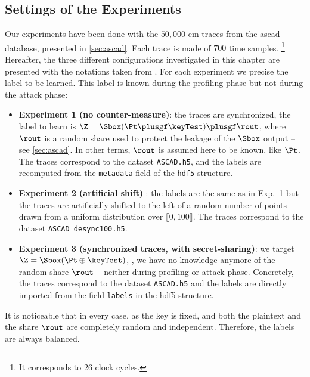 \subsection{Settings of the Experiments}
\label{sec:settings_cosade}
Our experiments have been done with the \(50,000\) \gls{em} traces from the \gls{ascad} database, presented in \autoref{sec:ascad}.
Each trace is made of \(700\) time samples.%
\footnote{
	It corresponds to 26 clock cycles.
}
Hereafter, the three different configurations investigated in this chapter are presented with the notations taken from \cite{prouff_study_2018}. 
For each experiment we precise the label to be learned.
This label is known during the profiling phase but not during the attack phase:
\begin{itemize}
	\item \textbf{Experiment 1 (no counter-measure)}: the traces are synchronized, the label to learn is \(\Z = \Sbox(\Pt \plusgf \keyTest) \plusgf \rout\), where \(\rout\) is a random share used to protect the leakage of the \(\Sbox\) output -- see \autoref{sec:ascad}.
	In other terms, \(\rout\) is assumed here to be known, like \(\Pt\).
	The traces correspond to the dataset \verb+ASCAD.h5+, and the labels are recomputed from the \verb+metadata+ field of the \verb+hdf5+ structure.
    \item \textbf{Experiment 2 (artificial shift)} : the labels are the same as in Exp.~1 but the traces are  artificially shifted to the left of a random number of points drawn from a uniform distribution over \(\llbracket0, 100\rrbracket\).
    The traces correspond to the dataset \verb+ASCAD_desync100.h5+.
	\item \textbf{Experiment 3 (synchronized traces, with secret-sharing)}: we target \(\Z = \Sbox(\Pt \oplus \keyTest)\), \ie{}, we have no knowledge anymore of the random share \(\rout\) -- neither during profiling or attack phase. Concretely, the traces correspond to the dataset \verb+ASCAD.h5+ and the labels are directly imported from the field \verb+labels+ in the \textsf{hdf5} structure.
\end{itemize}
It is noticeable that in every case, as the key is fixed, and both the plaintext and the share \(\rout\) are completely random and independent.
Therefore, the labels are always balanced.

